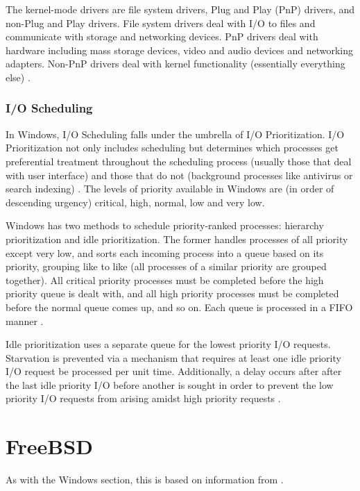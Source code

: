 \documentclass[10pt,draftclsnofoot,onecolumn,compsoc]{IEEEtran}
\begin{document}
	The kernel-mode drivers are file system drivers, Plug and Play (PnP) drivers, and non-Plug and Play drivers. File system drivers deal with I/O to files and communicate with storage and networking devices. PnP drivers deal with hardware including mass storage devices, video and audio devices and networking adapters. Non-PnP drivers deal with kernel functionality (essentially everything else) \cite{WInternals}.
	
	\subsubsection{I/O Scheduling}
	
	In Windows, I/O Scheduling falls under the umbrella of I/O Prioritization. I/O Prioritization not only includes scheduling but determines which processes get preferential treatment throughout the scheduling process (usually those that deal with user interface) and those that do not (background processes like antivirus or search indexing) \cite{WInternals}. The levels of priority available in Windows are (in order of descending urgency) critical, high, normal, low and very low.
	
	Windows has two methods to schedule priority-ranked processes: hierarchy prioritization and idle prioritization. The former handles processes of all priority except very low, and sorts each incoming process into a queue based on its priority, grouping like to like (all processes of a similar priority are grouped together). All critical priority processes must be completed before the high priority queue is dealt with, and all high priority processes must be completed before the normal queue comes up, and so on. Each queue is processed in a FIFO manner \cite{WInternals}.
	
	Idle prioritization uses a separate queue for the lowest priority I/O requests. Starvation is prevented via a mechanism that requires at least one idle priority I/O request be processed per unit time. Additionally, a delay occurs after after the last idle priority I/O before another is sought in order to prevent the low priority I/O requests from arising amidst high priority requests \cite{WInternals}.
	
	\section{FreeBSD}
	
	As with the Windows section, this is based on information from \cite{BSD}.
	
\end{document}

